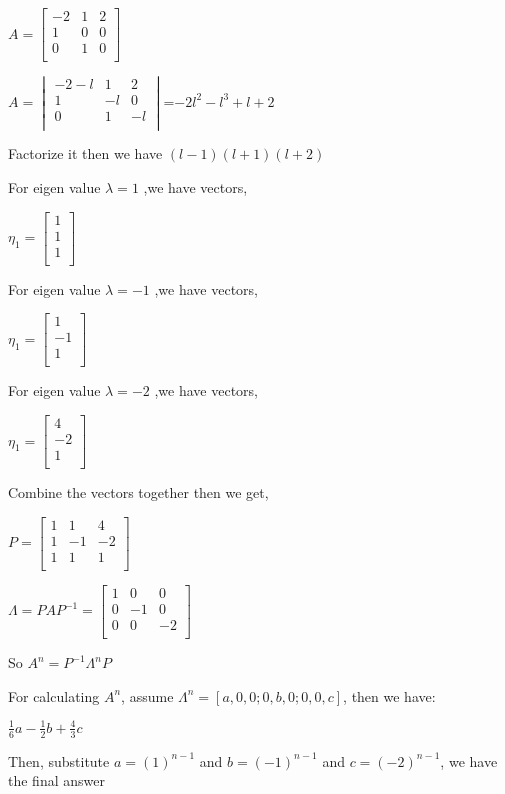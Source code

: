 \documentclass{article}
\begin{document}
$A=\begin{bmatrix}
-2 &1 &2\\
1 &0 &0\\
0 &1 &0\\
\end{bmatrix}
$

$A=\begin{vmatrix}
-2-l &1 &2\\
1 &-l &0\\
0 &1 &-l\\
\end{vmatrix}
$=$-2l^2-l^3+l+2$

Factorize it then we have $(l-1)(l+1)(l+2)$

For eigen value $\lambda=1$ ,we have vectors,

$\eta_1=\begin{bmatrix}
1\\
1\\
1\\
\end{bmatrix}
$

For eigen value $\lambda=-1$ ,we have vectors,

$\eta_1=\begin{bmatrix}
1\\
-1\\
1\\
\end{bmatrix}
$

For eigen value $\lambda=-2$ ,we have vectors,

$\eta_1=\begin{bmatrix}
4\\
-2\\
1\\
\end{bmatrix}
$

Combine the vectors together then we get, 

$P=\begin{bmatrix}
1 &1 &4\\
1 &-1 &-2\\
1 &1 &1\\
\end{bmatrix}
$

$\Lambda=PAP^{-1}=\begin{bmatrix}
1 &0 &0\\
0 &-1 &0\\
0 &0 &-2\\
\end{bmatrix}
$

So $A^n=P^{-1}\Lambda^n P$

For calculating $A^n$, assume $\Lambda^n=[a,0,0;0,b,0;0,0,c]$, then we have:

$\frac{1}{6}a-\frac{1}{2}b+\frac{4}{3}c$

Then, substitute $a=(1)^{n-1}$ and $b=(-1)^{n-1}$ and $c=(-2)^{n-1}$, we have the final answer
\end{document}
